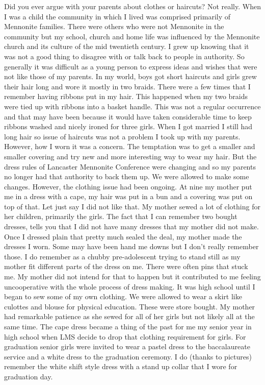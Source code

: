 Did you ever argue with your parents about clothes or haircuts?
Not really. When I was a child the community in which I lived was comprised primarily of Mennonite families. There were others who were not Mennonite in the community but my school, church and home life was influenced by the Mennonite church and its culture of the mid twentieth century. I grew up knowing that it was not a good thing to disagree with or talk back to people in authority. So generally it was difficult as a young person to express ideas and wishes that were not like those of my parents.  In my world, boys got short haircuts and girls grew their hair long and wore it mostly in two braids. There were a few times that I remember having ribbons put in my hair. This happened when my two braids were tied up with ribbons into a basket handle.  This was not a regular occurrence and that may have been because it would have taken considerable time to keep ribbons washed and nicely ironed for three girls.
When I got married I still had long hair so issue of haircuts was not a problem I took up with my parents. However, how I worn it was a concern. The temptation was to get a smaller and smaller covering and try new and more interesting way to wear my hair. But the dress rules of Lancaster Mennonite Conference were changing and so my parents no longer had that authority to back them up. We were allowed to make some changes. 
However, the clothing issue had been ongoing. At nine my mother put me in a dress with a cape, my hair was put in a bun and a covering was put on top of that. Let just say I did not like that. My mother sewed a lot of clothing for her children, primarily the girls. The fact that I can remember two bought dresses, tells you that I did not have many dresses that my mother did not make. Once I dressed plain that pretty much sealed the deal, my mother made the dresses I worn. Some may have been hand me downs but I don't really remember those. I do remember as a chubby pre-adolescent trying to stand still as my mother fit different parts of the dress on me. There were often pins that stuck me. My mother did not intend for that to happen but it contributed to me feeling uncooperative with the whole process of dress making. It was high school until I began to sew some of my own clothing. We were allowed to wear a skirt like culottes and blouse for physical education. These were store bought.
My mother had remarkable patience as she sewed for all of her girls but not likely all at the same time. The cape dress became a thing of the past for me my senior year in high school when LMS decide to drop that clothing requirement for girls. For graduation senior girls were invited to wear a pastel dress to the baccalaureate service and a white dress to the graduation ceremony. I do (thanks to pictures) remember the white shift style dress with a stand up collar that I wore for graduation day. 
